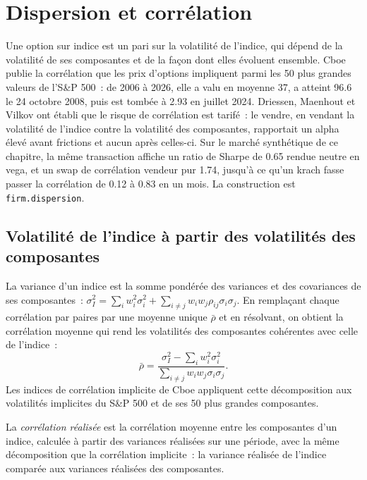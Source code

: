 \chapter{Dispersion et corrélation}\label{ch:s2:dispersion-and-correlation}

Une option sur indice est un pari sur la volatilité de l'indice, qui dépend de la volatilité de ses composantes et de la façon dont elles évoluent ensemble. Cboe publie la
corrélation que les prix d'options impliquent parmi les 50 plus grandes valeurs de l'S\&P 500~: de 2006 à 2026, elle a valu en moyenne 37, a atteint 96.6 le 24 octobre 2008, puis est tombée
à 2.93 en juillet 2024. Driessen, Maenhout et Vilkov ont établi que le risque de corrélation est tarifé~: le vendre, en vendant la volatilité de l'indice contre
la volatilité des composantes, rapportait un alpha élevé avant frictions et aucun après celles-ci. Sur le marché synthétique de ce chapitre, la même transaction affiche un ratio de Sharpe de 0.65
rendue neutre en vega, et un swap de corrélation vendeur pur 1.74, jusqu'à ce qu'un krach fasse passer la corrélation de 0.12 à 0.83 en un mois. La construction est
\texttt{firm.dispersion}.

\section{Volatilité de l'indice à partir des volatilités des composantes}

La variance d'un indice est la somme pondérée des variances et des covariances de ses composantes~: $\sigma_I^2 = \sum_i w_i^2\sigma_i^2 + \sum_{i \ne j} w_i w_j
\rho_{ij}\sigma_i\sigma_j$. En remplaçant chaque corrélation par paires par une moyenne unique $\bar\rho$ et en résolvant, on obtient la corrélation moyenne qui rend les
volatilités des composantes cohérentes avec celle de l'indice~:
\[
\bar\rho = \frac{\sigma_I^2 - \sum_i w_i^2\sigma_i^2}{\sum_{i \ne j} w_i w_j \sigma_i\sigma_j}.
\]
Les indices de corrélation implicite de Cboe appliquent cette décomposition aux volatilités implicites du S\&P 500 et de ses 50 plus grandes composantes.

\begin{definition}\label{def:s2:dispersion-and-correlation:realised}
La \emph{corrélation réalisée} est la corrélation moyenne entre les composantes d'un indice, calculée à partir des variances réalisées sur une
période, avec la même décomposition que la corrélation implicite~: la variance réalisée de l'indice comparée aux variances réalisées des composantes.
\end{definition}

